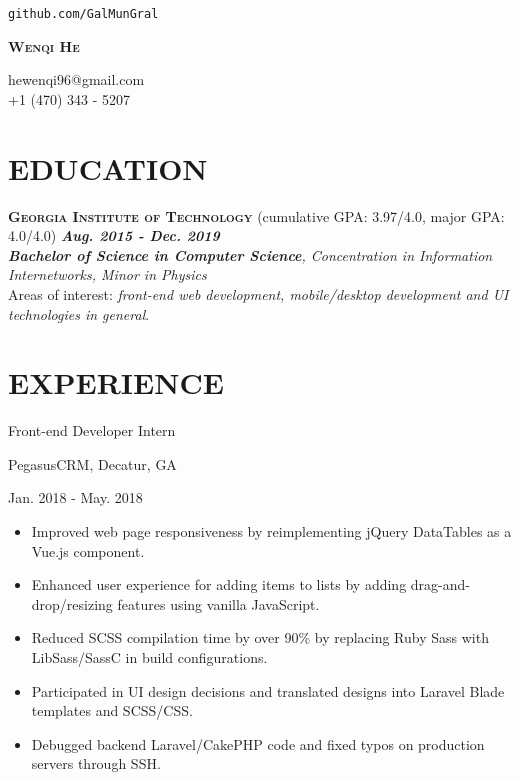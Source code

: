 \documentclass[11pt]{article}
\newcommand{\centertitle}[3]{
	{\noindent\bfseries\itshape
	\parbox[][0.5em][b]{0.35\textwidth}{#1\hfill}%
	\parbox[][0.5em][b]{0.3\textwidth}{\centerline{#2}}%
	\parbox[][0.5em][b]{0.35\textwidth}{\hfill#3}}
}
\begin{document}
\noindent
\parbox{0.25\textwidth}{\hfill\texttt{github.com/GalMunGral}}
\parbox{0.5\textwidth}{\centerline{\Huge\scshape\bfseries Wenqi He}}
\parbox{0.25\textwidth}{hewenqi96@gmail.com\\+1 (470) 343 - 5207}
%
\section*{EDUCATION}
{\large\scshape\bfseries Georgia Institute of Technology} \enspace (cumulative GPA: 3.97/4.0, major GPA: 4.0/4.0) \hfill {\itshape\bfseries Aug. 2015 - Dec. 2019}\\
{\itshape {\bfseries Bachelor of Science in Computer Science}, Concentration in Information Internetworks,  Minor in Physics}\\
Areas of interest: \textit{front-end web development, mobile/desktop development and UI technologies in general}.
\vspace{-0.5em}

\section*{EXPERIENCE}
\centertitle{Front-end Developer Intern}{PegasusCRM, Decatur, GA}{Jan. 2018 - May. 2018}
\begin{itemize}[leftmargin=15pt, noitemsep, topsep=0pt]
\item Improved web page responsiveness by reimplementing jQuery DataTables as a Vue.js component.
\item Enhanced user experience for adding items to lists by adding drag-and-drop/resizing features using vanilla JavaScript.
\item Reduced SCSS compilation time by over 90\% by replacing Ruby Sass with LibSass/SassC in build configurations.
\item Participated in UI design decisions and translated designs into Laravel Blade templates and SCSS/CSS.
\item Debugged backend Laravel/CakePHP code and fixed typos on production servers through SSH.
\end{itemize}
\vspace{-0.5em}
\end{document}
